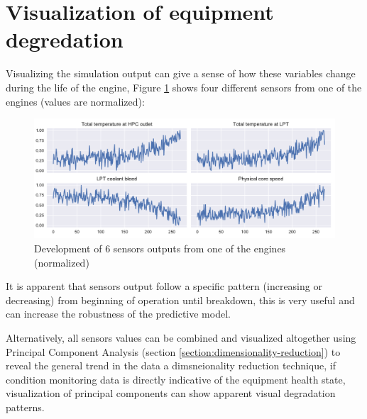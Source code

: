 \section{Visualization of equipment degredation}
Visualizing the simulation output can give a sense of how these variables change during the life of the engine, Figure \ref{fig:sensors-plot} shows four different sensors from one of the engines (values are normalized):

\begin{figure}[h]
    \centering
    \includegraphics[width=.8\linewidth]{figures/plots/sensors_plot.pdf}
    \caption{Development of 6 sensors outputs from one of the engines (normalized)}
    \label{fig:sensors-plot}
\end{figure}

It is apparent that sensors output follow a specific pattern (increasing or decreasing) from beginning of operation until breakdown, this is very useful and can increase the robustness of the predictive model.

Alternatively, all sensors values can be combined and visualized altogether using Principal Component Analysis (section \ref{section:dimensionality-reduction}) to reveal the general trend in the data a dimsneionality reduction technique, if condition monitoring data is directly indicative of the equipment health state, visualization of principal components can show apparent visual degradation patterns.

